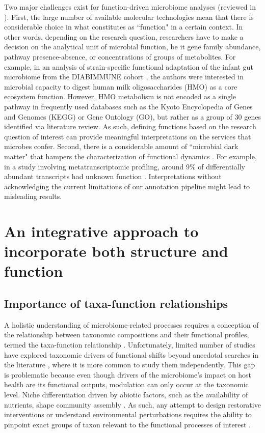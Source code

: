 Two major challenges exist for function-driven microbiome analyses (reviewed in \cite{heintz-buschart2018human}). First, the large number of available molecular technologies mean that there is considerable choice in what constitutes as ``function" in a certain context. In other words, depending on the research question, researchers have to make a decision on the analytical unit of microbial function, be it gene family abundance, pathway presence-absence, or concentrations of groups of metabolites. For example, in an analysis of strain-specific functional adaptation of the infant gut microbiome from the DIABIMMUNE cohort \cite{vatanen2018human}, the authors were interested in microbial capacity to digest human milk oligosaccharides (HMO) as a core ecosystem function. However, HMO metabolism is not encoded as a single pathway in frequently used databases such as the Kyoto Encyclopedia of Genes and Genomes (KEGG) or Gene Ontology (GO), but rather as a group of 30 genes identified via literature review. As such, defining functions based on the research question of interest can provide meaningful interpretations on the services that microbes confer. Second, there is a considerable amount of ``microbial dark matter" that hampers the characterization of functional dynamics \cite{jiao2021microbial}. For example, in a study involving metatranscriptomic profiling, around 9\% of differentially abundant transcripts had unknown function \cite{heintz-buschart2017integrated}. Interpretations without acknowledging the current limitations of our annotation pipeline might lead to misleading results. 

\section{An integrative approach to incorporate both structure and function}

\subsection{Importance of taxa-function relationships}

A holistic understanding of microbiome-related processes requires a conception of the relationship between taxonomic compositions and their functional profiles, termed the taxa-function relationship \cite{langille2018exploring, heintz-buschart2018human}. Unfortunately, limited number of studies have explored taxonomic drivers of functional shifts beyond anecdotal searches in the literature \cite{manor2017systematic}, where it is more common to study them independently. This gap is problematic because even though drivers of the microbiome's impact on host health are its functional outputs, modulation can only occur at the taxonomic level. Niche differentiation driven by abiotic factors, such as the availability of nutrients, shape community assembly \cite{pereira2017microbial}. As such, any attempt to design restorative interventions or understand environmental perturbations requires the ability to pinpoint exact groups of taxon relevant to the functional processes of interest \cite{wong2019new}.   

